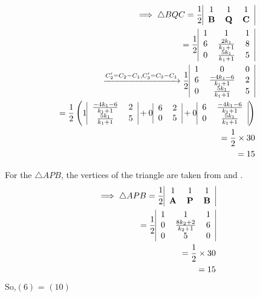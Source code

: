 \documentclass[12pt]{article}
\let\vec\mathbf
\providecommand{\brak}[1]{\ensuremath{\left(#1\right)}}
\begin{document}
\begin{align}
\implies\triangle BQC=
\frac{1}{2}\begin{tabular}{|c c c|}             
	1 &1&1\\                       
	$\vec{B}$&$\vec{Q}$&$\vec{C}$\\     
\end{tabular}\\
= \frac{1}{2}\begin{tabular}{|c c c|}
       1 &1&1\\
       6&$\frac{2k_1}{k_1+1}$&8 \\
       0&$\frac{5k_1}{k_1+1}$&5
   \end{tabular}\\
   \xrightarrow{C_2'=C_2-C_1,C_3'=C_3-C_1}\frac{1}{2} \begin{tabular}{|c c c|}
       1 &0&0\\
       6&$\frac{-4k_1-6}{k_1+1}$&2 \\
       0&$\frac{5k_1}{k_1+1}$&5
   \end{tabular}\\
	=\frac{1}{2}\brak{ 1\begin{tabular}{|c c|}
		$\frac{-4k_1-6}{k_1+1}$&2 \\    
	$\frac{5k_1}{k_1+1}$&5 \end{tabular}+0\begin{tabular}{|c c|}
  6&2\\0&5 \end{tabular}+0\begin{tabular}{|c c|}
   6&$\frac{-4k_1-6}{k_1+1}$\\
0&$\frac{5k_1}{k_1+1}$\end{tabular}}\\
=\frac{1}{2} \times30\\                          
=15 \end{align}


For the $\triangle APB$, the vertices of the triangle are taken from  and .
   \begin{align}
	   \implies \triangle APB =
\frac{1}{2}\begin{tabular}{|c c c|}            
	1 &1&1\\                            
	$\vec{A}$&$\vec{P}$&$\vec{B}$\\ 
\end{tabular}\\	 =  \frac{1}{2}
   \begin{tabular}{|c c c|}
       1 &1&1\\
       0&$\frac{8k_2+2}{k_2+1}$&6 \\
       0&5&0
   \end{tabular}\\
 =\frac{1}{2} \times30\\
 =15 \end{align}
So,\brak{6} = \brak{10}
\end{document}
